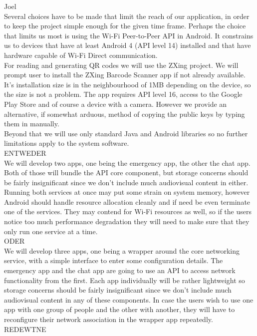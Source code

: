 Joel\\

Several choices have to be made that limit the reach of our application, in order to keep the project simple enough for the given time frame. Perhaps the choice that limits us most is using the Wi-Fi Peer-to-Peer API in Android. It constrains us to devices that have at least Android 4 (API level 14) installed and that have hardware capable of Wi-Fi Direct communication.\cite{P2PAPIGuide}\\
For reading and generating QR codes we will use the ZXing project\cite{ZXing}. We will prompt user to install the ZXing Barcode Scanner app if not already available. It's installation size is in the neighbourhood of 1MB depending on the device, so the size is not a problem. The app requires API level 16, access to the Google Play Store and of course a device with a camera. However we provide an alternative, if somewhat arduous, method of copying the public keys by typing them in manually.\\
Beyond that we will use only standard Java and Android libraries so no further limitations apply to the system software.\\

ENTWEDER\\

We will develop two apps, one being the emergency app, the other the chat app. Both of those will bundle the API core component, but storage concerns should be fairly insignificant since we don't include much audiovisual content in either. Running both services at once may put some strain on system memory, however Android should handle resource allocation cleanly and if need be even terminate one of the services. They may contend for Wi-Fi resources as well, so if the users notice too much performance degradation they will need to make sure that they only run one service at a time.\\

ODER\\

We will develop three apps, one being a wrapper around the core networking service, with a simple interface to enter some configuration details. The emergency app and the chat app are going to use an API to access network functionality from the first. Each app individually will be rather lightweight so storage concerns should be fairly insignificant since we don't include much audiovisual content in any of these components. In case the users wish to use one app with one group of people and the other with another, they will have to reconfigure their network association in the wrapper app repeatedly.\\

REDEWTNE\\


